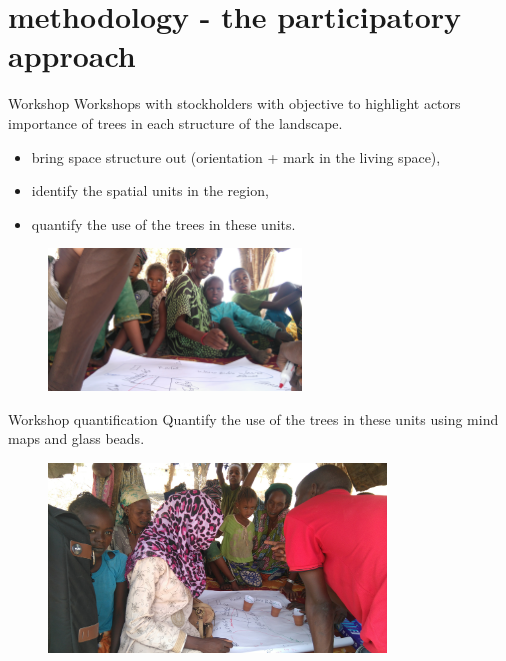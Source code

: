 \documentclass[newPxFont]{beamer}
\begin{document}
\section{methodology - the participatory approach}
\begin{frame}[c]{Workshop}
\vspace{-1cm}
Workshops with stockholders with objective to highlight actors importance of trees
in each structure of the landscape.

\begin{itemize}
  \item bring space structure out (orientation + mark in the living space),
  \item identify the spatial units in the region,
  \item quantify the use of the trees in these units.
\end{itemize}
\begin{figure}
	\centering
	\includegraphics[width = 0.6\textwidth,angle=180]{img/DSC_1789}
\end{figure}
\end{frame}



\begin{frame}[c]{Workshop quantification}
\vspace{-1cm}
Quantify the use of the trees in these units using mind maps and glass beads.

\begin{figure}
  \centering
  \includegraphics[width = 0.8\textwidth]{img/DSC_1793}
\end{figure}

\end{frame}
\end{document}

